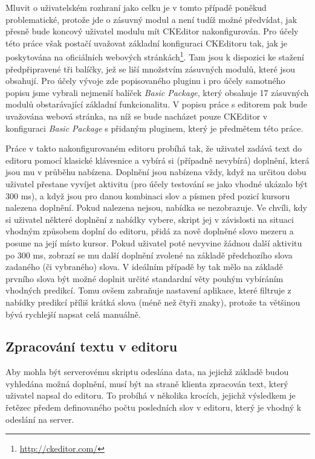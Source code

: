 \documentclass[a4paper,11pt]{article}
\begin{document}
Mluvit o uživatelském rozhraní jako celku je v tomto případě poněkud problematické, protože jde o zásuvný modul a není tudíž možné předvídat, jak přesně bude koncový uživatel modulu mít CKEditor nakonfigurován. Pro účely této práce však postačí uvažovat základní konfiguraci CKEditoru tak, jak je poskytována na oficiálních webových stránkách\footnote{\url{http://ckeditor.com/}}. Tam jsou k dispozici ke stažení předpřipravené tři balíčky, jež se liší množstvím zásuvných modulů, které jsou obsahují. Pro účely vývoje zde popisovaného pluginu i pro účely samotného popisu jsme vybrali nejmenší balíček {\it Basic Package}, který obsahuje 17 zásuvných modulů obstarávající základní funkcionalitu. V popisu práce s editorem pak bude uvažována webová stránka, na níž se bude nacházet pouze CKEditor v konfiguraci {\it Basic Package} s přidaným pluginem, který je předmětem této práce.

Práce v takto nakonfigurovaném editoru probíhá tak, že uživatel zadává text do editoru pomocí klasické klávesnice a vybírá si (případně nevybírá) doplnění, která jsou mu v průběhu nabízena. Doplnění jsou nabízena vždy, když na určitou dobu uživatel přestane vyvíjet aktivitu (pro účely testování se jako vhodné ukázalo být 300 ms), a když jsou pro danou kombinaci slov a písmen před pozicí kursoru nalezena doplnění. Pokud nalezena nejsou, nabídka se nezobrazuje. Ve chvíli, kdy si uživatel některé doplnění z nabídky vybere, skript jej v závislosti na situaci vhodným způsobem doplní do editoru, přidá za nově doplněné slovo mezeru a posune na její místo kursor. Pokud uživatel poté nevyvine žádnou další aktivitu po 300 ms, zobrazí se mu další doplnění zvolené na základě předchozího slova zadaného (či vybraného) slova. V ideálním případě by tak mělo na základě prvního slova být možné doplnit určité standardní věty pouhým vybíráním vhodných predikcí. Tomu ovšem zabraňuje nastavení aplikace, které filtruje z nabídky predikcí příliš krátká slova (méně než čtyři znaky), protože ta většinou bývá rychlejší napsat celá manuálně.

\subsection{Zpracování textu v editoru}

Aby mohla být serverovému skriptu odeslána data, na jejichž základě budou vyhledána možná doplnění, musí být na straně klienta zpracován text, který uživatel napsal do editoru. To probíhá v několika krocích, jejichž výsledkem je řetězec předem definovaného počtu posledních slov v editoru, který je vhodný k odeslání na server.
\end{document}
